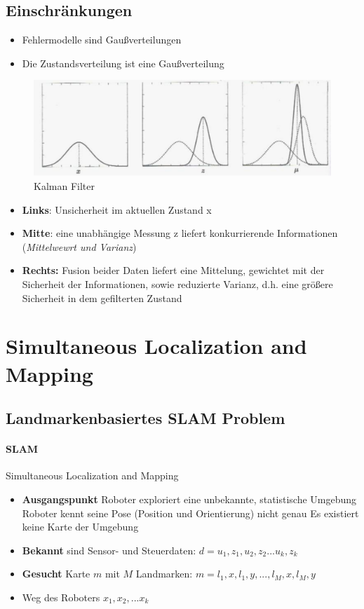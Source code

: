 \subsection{Einschränkungen}
\begin{itemize}
	\item Fehlermodelle sind Gaußverteilungen
	\item Die Zustandsverteilung ist eine Gaußverteilung
\end{itemize}
\begin{figure}[H]
	\begin{center}
		\includegraphics[scale=0.4]{Resources/PNG/KalmanFilter.PNG}
		\caption{Kalman Filter}
		\label{fig:PNG/KalmanFilter.PNG}
	\end{center}
\end{figure}
\begin{itemize}
	\item \textbf{Links}: Unsicherheit im aktuellen Zustand x
	\item \textbf{Mitte}: eine unabhängige Messung z liefert konkurrierende Informationen (\textit{Mittelwewrt und Varianz})
	\item \textbf{Rechts:} Fusion beider Daten liefert eine Mittelung, gewichtet mit der Sicherheit der Informationen, sowie reduzierte Varianz, d.h. eine größere Sicherheit in dem gefilterten Zustand
\end{itemize}
\section{Simultaneous Localization and Mapping}
\subsection{Landmarkenbasiertes SLAM Problem}
\paragraph{SLAM} Simultaneous Localization and Mapping
\begin{itemize}
	\item \textbf{Ausgangspunkt} Roboter exploriert eine unbekannte, statistische Umgebung
	\subitem Roboter kennt seine Pose (Position und Orientierung) nicht genau
	\subitem Es existiert keine Karte der Umgebung
	\item \textbf{Bekannt} sind Sensor- und Steuerdaten: $d = u_1, z_1, u_2, z_2 ... u_k, z_k$
	\item \textbf{Gesucht} Karte $m$ mit $M$ Landmarken: $m = l_1, x, l_1, y, ..., l_M,x,l_M,y$
	\item Weg des Roboters $x_1, x_2, ... x_k$
\end{itemize}
